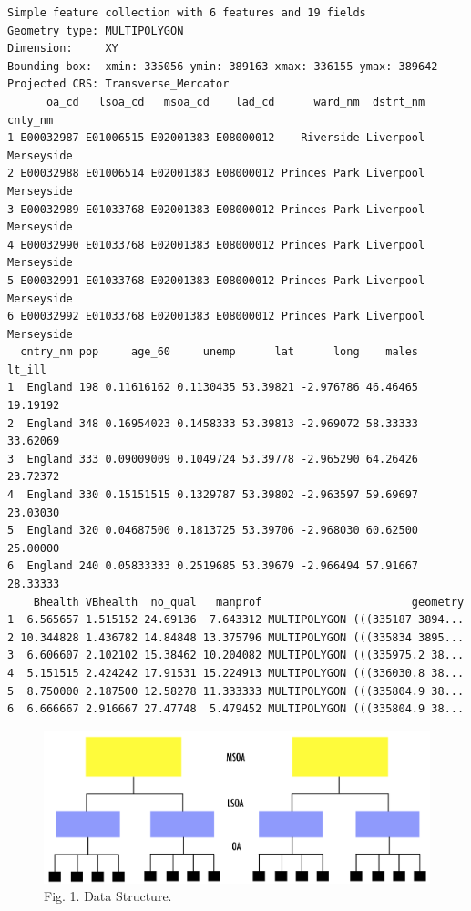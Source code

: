 \documentclass[
  letterpaper,
  DIV=11,
  numbers=noendperiod,
  oneside]{scrreprt}
\begin{document}
\begin{verbatim}
Simple feature collection with 6 features and 19 fields
Geometry type: MULTIPOLYGON
Dimension:     XY
Bounding box:  xmin: 335056 ymin: 389163 xmax: 336155 ymax: 389642
Projected CRS: Transverse_Mercator
      oa_cd   lsoa_cd   msoa_cd    lad_cd      ward_nm  dstrt_nm    cnty_nm
1 E00032987 E01006515 E02001383 E08000012    Riverside Liverpool Merseyside
2 E00032988 E01006514 E02001383 E08000012 Princes Park Liverpool Merseyside
3 E00032989 E01033768 E02001383 E08000012 Princes Park Liverpool Merseyside
4 E00032990 E01033768 E02001383 E08000012 Princes Park Liverpool Merseyside
5 E00032991 E01033768 E02001383 E08000012 Princes Park Liverpool Merseyside
6 E00032992 E01033768 E02001383 E08000012 Princes Park Liverpool Merseyside
  cntry_nm pop     age_60     unemp      lat      long    males   lt_ill
1  England 198 0.11616162 0.1130435 53.39821 -2.976786 46.46465 19.19192
2  England 348 0.16954023 0.1458333 53.39813 -2.969072 58.33333 33.62069
3  England 333 0.09009009 0.1049724 53.39778 -2.965290 64.26426 23.72372
4  England 330 0.15151515 0.1329787 53.39802 -2.963597 59.69697 23.03030
5  England 320 0.04687500 0.1813725 53.39706 -2.968030 60.62500 25.00000
6  England 240 0.05833333 0.2519685 53.39679 -2.966494 57.91667 28.33333
    Bhealth VBhealth  no_qual   manprof                       geometry
1  6.565657 1.515152 24.69136  7.643312 MULTIPOLYGON (((335187 3894...
2 10.344828 1.436782 14.84848 13.375796 MULTIPOLYGON (((335834 3895...
3  6.606607 2.102102 15.38462 10.204082 MULTIPOLYGON (((335975.2 38...
4  5.151515 2.424242 17.91531 15.224913 MULTIPOLYGON (((336030.8 38...
5  8.750000 2.187500 12.58278 11.333333 MULTIPOLYGON (((335804.9 38...
6  6.666667 2.916667 27.47748  5.479452 MULTIPOLYGON (((335804.9 38...
\end{verbatim}

\begin{figure}[H]

{\centering \includegraphics{figs/ch5/datastr.png}

}

\caption{Fig. 1. Data Structure.}

\end{figure}%
\end{document}
